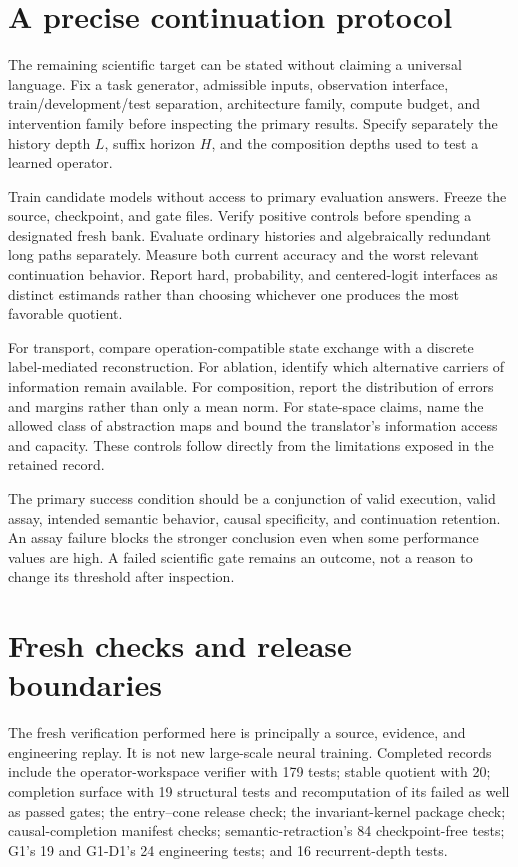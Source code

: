 \documentclass[11pt]{article}
\begin{document}
\section{A precise continuation protocol}
The remaining scientific target can be stated without claiming a universal language. Fix a task generator, admissible inputs, observation interface, train/development/test separation, architecture family, compute budget, and intervention family before inspecting the primary results. Specify separately the history depth \(L\), suffix horizon \(H\), and the composition depths used to test a learned operator.

Train candidate models without access to primary evaluation answers. Freeze the source, checkpoint, and gate files. Verify positive controls before spending a designated fresh bank. Evaluate ordinary histories and algebraically redundant long paths separately. Measure both current accuracy and the worst relevant continuation behavior. Report hard, probability, and centered-logit interfaces as distinct estimands rather than choosing whichever one produces the most favorable quotient.

For transport, compare operation-compatible state exchange with a discrete label-mediated reconstruction. For ablation, identify which alternative carriers of information remain available. For composition, report the distribution of errors and margins rather than only a mean norm. For state-space claims, name the allowed class of abstraction maps and bound the translator's information access and capacity. These controls follow directly from the limitations exposed in the retained record.

The primary success condition should be a conjunction of valid execution, valid assay, intended semantic behavior, causal specificity, and continuation retention. An assay failure blocks the stronger conclusion even when some performance values are high. A failed scientific gate remains an outcome, not a reason to change its threshold after inspection.

\section{Fresh checks and release boundaries}
The fresh verification performed here is principally a source, evidence, and engineering replay. It is not new large-scale neural training. Completed records include the operator-workspace verifier with 179 tests; stable quotient with 20; completion surface with 19 structural tests and recomputation of its failed as well as passed gates; the entry--cone release check; the invariant-kernel package check; causal-completion manifest checks; semantic-retraction's 84 checkpoint-free tests; G1's 19 and G1-D1's 24 engineering tests; and 16 recurrent-depth tests. \cite{validation}
\end{document}
